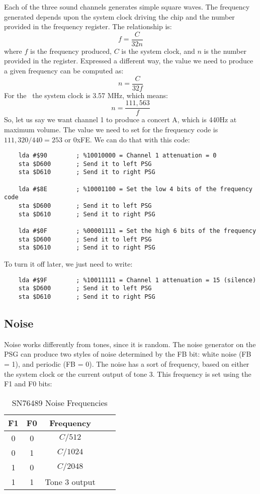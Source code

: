 Each of the three sound channels generates simple square waves. The frequency generated depends upon the system clock driving the chip and the number provided in the frequency register. The relationship is:
\[
f = \frac{C}{32n}
\]
where $f$ is the frequency produced, $C$ is the system clock, and $n$ is the number provided in the register. Expressed a different way, the value we need to produce a given frequency can be computed as:
\[
n = \frac{C}{32f}
\]
For the \jr\ the system clock is 3.57 MHz, which means:
\[
n = \frac{111,563}{f}
\]
So, let us say we want channel 1 to produce a concert A, which is 440Hz at maximum volume. The value we need to set for the frequency code is $111,320 / 440 = 253$ or 0xFE. We can do that with this code:

\begin{verbatim}
    lda #$90        ; %10010000 = Channel 1 attenuation = 0
    sta $D600       ; Send it to left PSG
    sta $D610       ; Send it to right PSG

    lda #$8E        ; %10001100 = Set the low 4 bits of the frequency code
    sta $D600       ; Send it to left PSG
    sta $D610       ; Send it to right PSG

    lda #$0F        ; %00001111 = Set the high 6 bits of the frequency
    sta $D600       ; Send it to left PSG
    sta $D610       ; Send it to right PSG
\end{verbatim}
To turn it off later, we just need to write:

\begin{verbatim}
    lda #$9F        ; %10011111 = Channel 1 attenuation = 15 (silence)
    sta $D600       ; Send it to left PSG
    sta $D610       ; Send it to right PSG
\end{verbatim}

\subsection*{Noise}

Noise works differently from tones, since it is random. The noise generator on the PSG can produce two styles of noise determined by the FB bit: white noise (FB = 1), and periodic (FB = 0). The noise has a sort of frequency, based on either the system clock or the current output of tone 3. This frequency is set using the F1 and F0 bits:

\begin{table}[ht]
	\begin{center}
		\begin{tabular}{|c|c|c|c|l|} \hline
			F1 & F0 & Frequency \\ \hline \hline
			0 & 0 & $C / 512$ \\ \hline
			0 & 1 & $C / 1024$ \\ \hline
			1 & 0 & $C / 2048$ \\ \hline
			1 & 1 & Tone 3 output \\ \hline
		\end{tabular}
	\end{center}
	\caption{SN76489 Noise Frequencies}
	\label{tab:psg_noise_freq}
\end{table}

